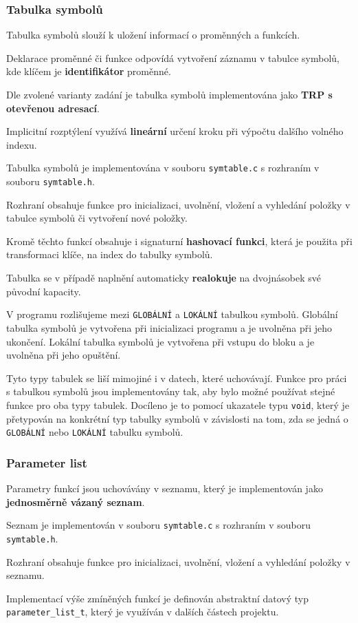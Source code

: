 \documentclass[a4paper, 11pt]{article}
\begin{document}
	\subsubsection{Tabulka symbolů}
	Tabulka symbolů slouží k uložení informací o proměnných a funkcích.
	\par\noindent Deklarace proměnné či funkce odpovídá vytvoření záznamu v tabulce symbolů, kde klíčem je \textbf{identifikátor} proměnné.
	\par\noindent Dle zvolené varianty zadání je tabulka symbolů implementována jako \textbf{TRP s otevřenou adresací}.
	\par\noindent Implicitní rozptýlení využívá \textbf{lineární} určení kroku při výpočtu dalšího volného indexu. 
	\par\noindent Tabulka symbolů je implementována v souboru \texttt{symtable.c} s rozhraním v souboru \texttt{symtable.h}.
	\par\noindent Rozhraní obsahuje funkce pro inicializaci, uvolnění, vložení a vyhledání položky v tabulce symbolů či vytvoření nové položky.
	\par\noindent Kromě těchto funkcí obsahuje i signaturní \textbf{hashovací funkci}, která je použita při transformaci klíče, na index do tabulky symbolů.
	\par\noindent Tabulka se v případě naplnění automaticky \textbf{realokuje} na dvojnásobek své původní kapacity.
	\par\noindent V programu rozlišujeme mezi \texttt{GLOBÁLNÍ} a \texttt{LOKÁLNÍ} tabulkou symbolů. Globální tabulka symbolů je vytvořena při inicializaci programu a je uvolněna při jeho ukončení. Lokální tabulka symbolů je vytvořena při vstupu do bloku a je uvolněna při jeho opuštění.
	\par\noindent Tyto typy tabulek se liší mimojiné i v datech, které uchovávají. Funkce pro práci s tabulkou symbolů jsou implementovány tak, aby bylo možné používat stejné funkce pro oba typy tabulek. Docíleno je to pomocí ukazatele typu \texttt{void}, který je přetypován na konkrétní typ tabulky symbolů v závislosti na tom, zda se jedná o \texttt{GLOBÁLNÍ} nebo \texttt{LOKÁLNÍ} tabulku symbolů.
	


	\subsubsection{Parameter list}
	Parametry funkcí jsou uchovávány v seznamu, který je implementován jako \textbf{jednosměrně vázaný seznam}.
	\par\noindent Seznam je implementován v souboru \texttt{symtable.c} s rozhraním v souboru \texttt{symtable.h}.
	\par\noindent Rozhraní obsahuje funkce pro inicializaci, uvolnění, vložení a vyhledání položky v seznamu.
	\par\noindent Implementací výše zmíněných funkcí je definován abstraktní datový typ \texttt{parameter\_list\_t}, který je vy\-užíván v dalších částech projektu.
\end{document}
